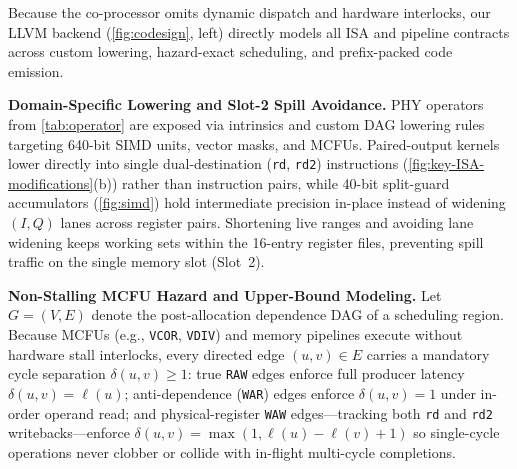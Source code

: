 \documentclass[9pt,conference]{IEEEtran}
\begin{document}
Because the co-processor omits dynamic dispatch and hardware interlocks, our LLVM backend (\autoref{fig:codesign}, left) directly models all ISA and pipeline contracts across custom lowering, hazard-exact scheduling, and prefix-packed code emission.

\textbf{Domain-Specific Lowering and Slot-2 Spill Avoidance.}
PHY operators from \autoref{tab:operator} are exposed via intrinsics and custom DAG lowering rules targeting 640-bit SIMD units, vector masks, and MCFUs. Paired-output kernels lower directly into single dual-destination (\texttt{rd}, \texttt{rd2}) instructions (\autoref{fig:key-ISA-modifications}(b)) rather than instruction pairs, while 40-bit split-guard accumulators (\autoref{fig:simd}) hold intermediate precision in-place instead of widening $(I, Q)$ lanes across register pairs. Shortening live ranges and avoiding lane widening keeps working sets within the 16-entry register files, preventing spill traffic on the single memory slot (Slot~2).

\textbf{Non-Stalling MCFU Hazard and Upper-Bound Modeling.}
Let $G = (V, E)$ denote the post-allocation dependence DAG of a scheduling region. Because MCFUs (e.g., \texttt{VCOR}, \texttt{VDIV}) and memory pipelines execute without hardware stall interlocks, every directed edge $(u, v) \in E$ carries a mandatory cycle separation $\delta(u, v) \ge 1$: true \texttt{RAW} edges enforce full producer latency $\delta(u, v) = \ell(u)$; anti-dependence (\texttt{WAR}) edges enforce $\delta(u, v) = 1$ under in-order operand read; and physical-register \texttt{WAW} edges---tracking both \texttt{rd} and \texttt{rd2} writebacks---enforce $\delta(u, v) = \max(1, \ell(u) - \ell(v) + 1)$ so single-cycle operations never clobber or collide with in-flight multi-cycle completions.
\end{document}
